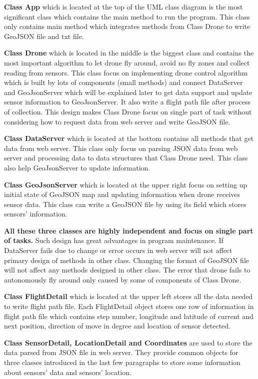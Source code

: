 \documentclass[12pt]{article}
\begin{document}
\textbf{Class App} which is located at the top of the UML class diagram is the most significant class which contains the main method to run the program. This class only contains main method which integrates methods from Class Drone to write GeoJSON file and txt file.

\textbf{Class Drone} which is located in the middle is the biggest class and contains the most important algorithm to let drone fly around, avoid no fly zones and collect reading from sensors. This class focus on implementing drone control algorithm which is built by lots of components (small methods) and connect DataServer and GeoJsonServer which will be explained later to get data support and update sensor information to GeoJsonServer. It also write a flight path file after process of collection. This design makes Class Drone focus on single part of task without considering how to request data from web server and write GeoJSON file. 

\textbf{Class DataServer} which is located at the bottom contains all methods that get data from web server. This class only focus on parsing JSON data from web server and processing data to data structures that Class Drone need. This class also help GeoJsonServer to update information. 

\textbf{Class GeoJsonServer} which is located at the upper right focus on setting up initial state of GeoJSON map and updating information when drone receives sensor data. This class can write a GeoJSON file by using its field which stores sensors' information. 

\textbf{All these three classes are highly independent and focus on single part of tasks.} Such design has great advantages in program maintenance. If DataServer fails due to change or error occurs in web server will not affect primary design of methods in other class. Changing the format of GeoJSON file will not affect any methods designed in other class. The error that drone fails to autonomously fly around only caused by some of components of Class Drone.

\textbf{Class FlightDetail} which is located at the upper left stores all the data needed to write flight path file. Each FlightDetail object stores one row of information in flight path file which contains step number, longitude and latitude of current and next position, direction of move in degree and location of sensor detected.

\textbf{Class SensorDetail, LocationDetail and Coordinates} are used to store the data parsed from JSON file in web server. They provide common objects for three classes introduced in the last few paragraphs to store some information about sensors' data and sensors' location.
\end{document}
